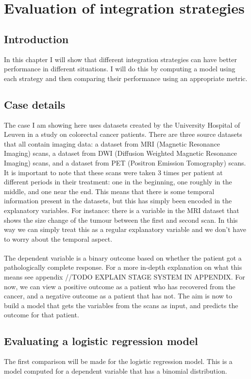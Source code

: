 \chapter{Evaluation of integration strategies}
\label{cha:evaluation}


\section{Introduction}
\label{sec:evaluation-introduction}
In this chapter I will show that different integration strategies can have better performance in different situations. I will do this by computing a model using each strategy and then comparing their performance using an appropriate metric.
\section{Case details}
\label{sec:evaluation-casedetails}
The case I am showing here uses datasets created by the University Hospital of Leuven in a study on colorectal cancer patients. There are three source datasets that all contain imaging data: a dataset from MRI (Magnetic Resonance Imaging) scans, a dataset from DWI (Diffusion Weighted Magnetic Resonance Imaging) scans, and a dataset from PET (Positron Emission Tomography) scans. It is important to note that these scans were taken 3 times per patient at different periods in their treatment: one in the beginning, one roughly in the middle, and one near the end. This means that there is some temporal information present in the datasets, but this has simply been encoded in the explanatory variables. For instance: there is a variable in the MRI dataset that shows the size change of the tumour between the first and second scan. In this way we can simply treat this as a regular explanatory variable and we don't have to worry about the temporal aspect. \\ \\
The dependent variable is a binary outcome based on whether the patient got a pathologically complete response. For a more in-depth explanation on what this means see appendix //TODO EXPLAIN STAGE SYSTEM IN APPENDIX. For now, we can view a positive outcome as a patient who has recovered from the cancer, and a negative outcome as a patient that has not. The aim is now to build a model that gets the variables from the scans as input, and predicts the outcome for that patient.
\section{Evaluating a logistic regression model}
\label{sec:evaluation-logisticregression}
The first comparison will be made for the logistic regression model. This is a model computed for a dependent variable that has a binomial distribution.
